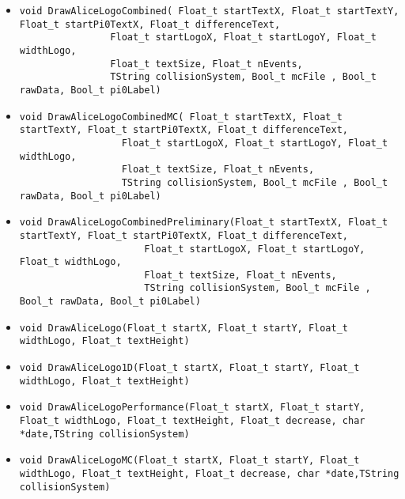 \begin{itemize}
\item 	\begin{lstlisting}
void DrawAliceLogoCombined( Float_t startTextX, Float_t startTextY, Float_t startPi0TextX, Float_t differenceText,
			    Float_t startLogoX, Float_t startLogoY, Float_t widthLogo, 
			    Float_t textSize, Float_t nEvents,
			    TString collisionSystem, Bool_t mcFile , Bool_t rawData, Bool_t pi0Label)
	       	\end{lstlisting}
\item 	\begin{lstlisting}
void DrawAliceLogoCombinedMC( Float_t startTextX, Float_t startTextY, Float_t startPi0TextX, Float_t differenceText,
			      Float_t startLogoX, Float_t startLogoY, Float_t widthLogo, 
			      Float_t textSize, Float_t nEvents,
			      TString collisionSystem, Bool_t mcFile , Bool_t rawData, Bool_t pi0Label)
	       	\end{lstlisting}
\item 	\begin{lstlisting}
void DrawAliceLogoCombinedPreliminary(Float_t startTextX, Float_t startTextY, Float_t startPi0TextX, Float_t differenceText,
				      Float_t startLogoX, Float_t startLogoY, Float_t widthLogo, 
				      Float_t textSize, Float_t nEvents,
				      TString collisionSystem, Bool_t mcFile , Bool_t rawData, Bool_t pi0Label)
	       	\end{lstlisting}
\item 	\begin{lstlisting}
void DrawAliceLogo(Float_t startX, Float_t startY, Float_t widthLogo, Float_t textHeight)
	       	\end{lstlisting}
\item 	\begin{lstlisting}
void DrawAliceLogo1D(Float_t startX, Float_t startY, Float_t widthLogo, Float_t textHeight)
	       	\end{lstlisting}
\item 	\begin{lstlisting}
void DrawAliceLogoPerformance(Float_t startX, Float_t startY, Float_t widthLogo, Float_t textHeight, Float_t decrease, char *date,TString collisionSystem)
	\end{lstlisting}
\item 	\begin{lstlisting}
void DrawAliceLogoMC(Float_t startX, Float_t startY, Float_t widthLogo, Float_t textHeight, Float_t decrease, char *date,TString collisionSystem)
	       	\end{lstlisting}

\end{itemize}
